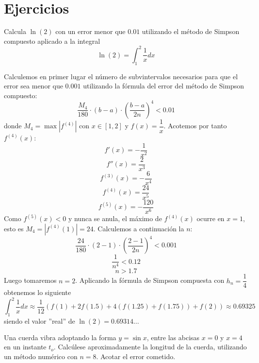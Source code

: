 \section{Ejercicios}
\begin{ejer}
Calcula $\ln(2)$ con un error menor que $0.01$ utilizando el método de Simpson compuesto aplicado a la integral
$$\ln(2)=\int_1^2\dfrac{1}{x}dx$$
\end{ejer}
\begin{sol}
Calculemos en primer lugar el número de subvintervalos necesarios para que el error sea menor que $0.001$ utilizando la fórmula del error del método de Simpson compuesto:
$$\dfrac{M_4}{180}\cdot(b-a)\cdot \left(\dfrac{b-a}{2n}\right)^4<0.01$$
donde $M_4=\max|f^{(4)}|$ con $x\in[1,2]$ y $f(x)=\dfrac{1}{x}$. Acotemos por tanto  $f^{(4)}(x)$:
$$f'(x)=-\dfrac{1}{x^2}$$
$$f''(x)=\dfrac{2}{x^3}$$
$$f^{(3)}(x)=-\dfrac{6}{x^4}$$
$$f^{(4)}(x)=\dfrac{24}{x^5}$$
$$f^{(5)}(x)=-\dfrac{120}{x^6}$$
Como $f^{(5)}(x)<0$ y nunca se anula, el máximo de $f^{(4)}(x)$ ocurre en $x=1$, esto es $M_4=|f^{(4)}(1)|=24$. Calculemos a continuación la $n$:
$$\dfrac{24}{180}\cdot(2-1)\cdot \left(\dfrac{2-1}{2n}\right)^4<0.001$$
$$\dfrac{1}{n^4}<0.12$$
$$n>1.7$$
Luego tomaremos $n=2$. Aplicando la fórmula de Simpson compuesta con $h_n=\dfrac{1}{4}$ obtenemos lo siguiente
$$\int_1^2\dfrac{1}{x}dx\approx \dfrac{1}{12}(f(1)+2f(1.5)+4(f(1.25)+f(1.75))+f(2))\approx 0.69325$$
siendo el valor ''real'' de $\ln(2)=0.69314\ldots$
\end{sol}
\begin{ejer}
    Una cuerda vibra adoptando la forma $y=\sin x $, entre las abcisas $x=0$ y $x=4$ en un instante $t_o$. Calcúlese aproximadamente la longitud de la cuerda, utilizando un método numérico con $n=8$. Acotar el error cometido.
\end{ejer}
